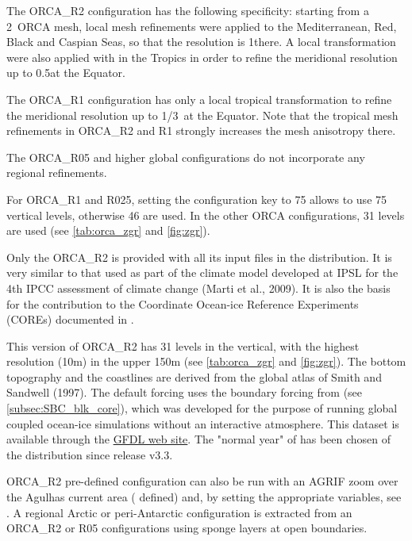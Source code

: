 \documentclass[../tex_main/NEMO_manual]{subfiles}
\begin{document}
The ORCA\_R2 configuration has the following specificity: starting from a 2\deg~ORCA mesh,
local mesh refinements were applied to the Mediterranean, Red, Black and Caspian Seas,
so that the resolution is 1\deg {}\deg there.
A local transformation were also applied with in the Tropics in order to refine the meridional resolution up to
0.5\deg at the Equator.

The ORCA\_R1 configuration has only a local tropical transformation to refine the meridional resolution up to
1/3\deg~at the Equator.
Note that the tropical mesh refinements in ORCA\_R2 and R1 strongly increases the mesh anisotropy there.

The ORCA\_R05 and higher global configurations do not incorporate any regional refinements.  

For ORCA\_R1 and R025, setting the configuration key to 75 allows to use 75 vertical levels, otherwise 46 are used.
In the other ORCA configurations, 31 levels are used
(see \autoref{tab:orca_zgr}  and \autoref{fig:zgr}).

Only the ORCA\_R2 is provided with all its input files in the \NEMO distribution.
It is very similar to that used as part of the climate model developed at IPSL for the 4th IPCC assessment of
climate change (Marti et al., 2009).
It is also the basis for the \NEMO contribution to the Coordinate Ocean-ice Reference Experiments (COREs)
documented in \citet{Griffies_al_OM09}. 

This version of ORCA\_R2 has 31 levels in the vertical, with the highest resolution (10m) in the upper 150m
(see \autoref{tab:orca_zgr} and \autoref{fig:zgr}). 
The bottom topography and the coastlines are derived from the global atlas of Smith and Sandwell (1997). 
The default forcing uses the boundary forcing from \citet{Large_Yeager_Rep04} (see \autoref{subsec:SBC_blk_core}), 
which was developed for the purpose of running global coupled ocean-ice simulations without
an interactive atmosphere.
This \citet{Large_Yeager_Rep04} dataset is available through
the \href{http://nomads.gfdl.noaa.gov/nomads/forms/mom4/CORE.html}{GFDL web site}.
The "normal year" of \citet{Large_Yeager_Rep04} has been chosen of the \NEMO distribution since release v3.3. 

ORCA\_R2 pre-defined configuration can also be run with an AGRIF zoom over the Agulhas current area
( defined) and, by setting the appropriate variables, see .
A regional Arctic or peri-Antarctic configuration is extracted from an ORCA\_R2 or R05 configurations using
sponge layers at open boundaries. 
\end{document}
